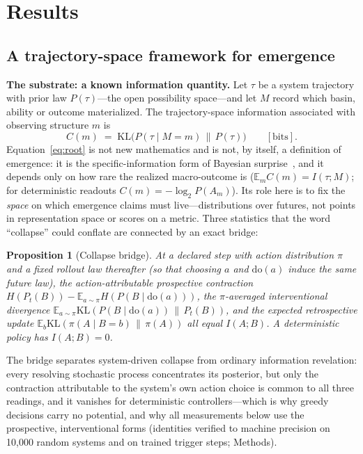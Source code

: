 \documentclass[11pt]{article}
\newtheorem{proposition}{Proposition}
\theoremstyle{definition}
\newcommand{\dO}[1]{\mathrm{do}(#1)}
\newcommand{\KL}{\mathrm{KL}}
\begin{document}
\section{Results}

\subsection*{A trajectory-space framework for emergence}
\label{sec:framework}


\textbf{The substrate: a known information quantity.}
Let $\tau$ be a system trajectory with prior law $P(\tau)$---the open
possibility space---and let $M$ record which basin, ability or outcome
materialized. The trajectory-space information associated with observing
structure $m$ is
\begin{equation}
  C(m) \;=\; \KL\!\bigl( P(\tau \mid M{=}m) \,\big\|\, P(\tau) \bigr)
  \qquad [\text{bits}].
  \label{eq:root}
\end{equation}
Equation~\eqref{eq:root} is not new mathematics and is not, by itself, a
definition of emergence: it is the specific-information form of Bayesian
surprise~\cite{ittibaldi2009,deweese1999}, and it depends only on how
rare the realized macro-outcome is ($\mathbb{E}_{m}C(m)=I(\tau;M)$; for
deterministic readouts $C(m)=-\log_2 P(A_m)$). Its role here is to fix
the \emph{space} on which emergence claims must live---distributions
over futures, not points in representation space or scores on a
metric. Three statistics that the word ``collapse'' could conflate are
connected by an exact bridge:

\begin{proposition}[Collapse bridge]\label{prop:bridge}
At a declared step with action distribution $\pi$ and a fixed rollout
law thereafter (so that choosing $a$ and $\dO{a}$ induce the same
future law), the action-attributable prospective contraction
$H(P_t(B)) - \mathbb{E}_{a\sim\pi} H(P(B \mid \dO{a}))$, the
$\pi$-averaged interventional divergence
$\mathbb{E}_{a\sim\pi} \KL(P(B \mid \dO{a}) \,\|\, P_t(B))$, and the
expected retrospective update
$\mathbb{E}_{b} \KL(\pi(A \mid B{=}b) \,\|\, \pi(A))$ all equal
$I(A;B)$. A deterministic policy has $I(A;B)=0$.
\end{proposition}

The bridge separates system-driven collapse from ordinary information
revelation: every resolving stochastic process concentrates its
posterior, but only the contraction attributable to the system's own
action choice is common to all three readings, and it vanishes for
deterministic controllers---which is why greedy decisions carry no
potential, and why all measurements below use the prospective,
interventional forms (identities verified to machine precision on
10,000 random systems and on trained trigger steps; Methods).
\end{document}
